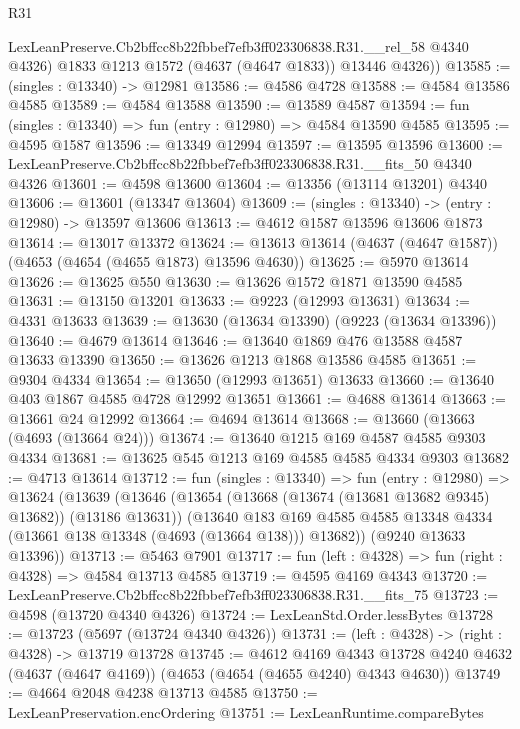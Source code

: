 \begin{lexlean}{R31}
\begin{coremodule}
        LexLeanPreserve.Cb2bffcc8b22fbbef7efb3ff023306838.R31.__rel_58 @4340 @4326)
        @1833
        @1213
        @1572
        (@4637 (@4647 @1833))
        @13446
        @4326))
@13585 := (singles : @13340) -> @12981
@13586 := @4586 @4728
@13588 := @4584 @13586 @4585
@13589 := @4584 @13588
@13590 := @13589 @4587
@13594 := fun (singles : @13340) => fun (entry : @12980) => @4584 @13590 @4585
@13595 := @4595 @1587
@13596 := @13349 @12994
@13597 := @13595 @13596
@13600 := LexLeanPreserve.Cb2bffcc8b22fbbef7efb3ff023306838.R31.__fits_50 @4340 @4326
@13601 := @4598 @13600
@13604 := @13356 (@13114 @13201) @4340
@13606 := @13601 (@13347 @13604)
@13609 := (singles : @13340) -> (entry : @12980) -> @13597 @13606
@13613 := @4612 @1587 @13596 @13606 @1873
@13614 := @13017 @13372
@13624 := @13613 @13614 (@4637 (@4647 @1587)) (@4653 (@4654 (@4655 @1873) @13596 @4630))
@13625 := @5970 @13614
@13626 := @13625 @550
@13630 := @13626 @1572 @1871 @13590 @4585
@13631 := @13150 @13201
@13633 := @9223 (@12993 @13631)
@13634 := @4331 @13633
@13639 := @13630 (@13634 @13390) (@9223 (@13634 @13396))
@13640 := @4679 @13614
@13646 := @13640 @1869 @476 @13588 @4587 @13633 @13390
@13650 := @13626 @1213 @1868 @13586 @4585
@13651 := @9304 @4334
@13654 := @13650 (@12993 @13651) @13633
@13660 := @13640 @403 @1867 @4585 @4728 @12992 @13651
@13661 := @4688 @13614
@13663 := @13661 @24 @12992
@13664 := @4694 @13614
@13668 := @13660 (@13663 (@4693 (@13664 @24)))
@13674 := @13640 @1215 @169 @4587 @4585 @9303 @4334
@13681 := @13625 @545 @1213 @169 @4585 @4585 @4334 @9303
@13682 := @4713 @13614
@13712 := fun (singles : @13340) =>
  fun (entry : @12980) =>
  @13624
    (@13639
      (@13646
        (@13654 (@13668 (@13674 (@13681 @13682 @9345) @13682)) (@13186 @13631))
        (@13640
          @183
          @169
          @4585
          @4585
          @13348
          @4334
          (@13661 @138 @13348 (@4693 (@13664 @138)))
          @13682))
      (@9240 @13633 @13396))
@13713 := @5463 @7901
@13717 := fun (left : @4328) => fun (right : @4328) => @4584 @13713 @4585
@13719 := @4595 @4169 @4343
@13720 := LexLeanPreserve.Cb2bffcc8b22fbbef7efb3ff023306838.R31.__fits_75
@13723 := @4598 (@13720 @4340 @4326)
@13724 := LexLeanStd.Order.lessBytes
@13728 := @13723 (@5697 (@13724 @4340 @4326))
@13731 := (left : @4328) -> (right : @4328) -> @13719 @13728
@13745 := @4612
    @4169
    @4343
    @13728
    @4240
    @4632
    (@4637 (@4647 @4169))
    (@4653 (@4654 (@4655 @4240) @4343 @4630))
@13749 := @4664 @2048 @4238 @13713 @4585
@13750 := LexLeanPreservation.encOrdering
@13751 := LexLeanRuntime.compareBytes

\end{coremodule}
\end{lexlean}
